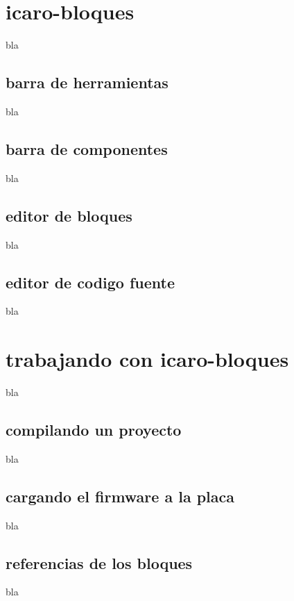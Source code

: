 \documentclass[letterpaper,10pt,english]{sphinxmanual}
\begin{document}
\chapter{icaro-bloques}
\label{icaro_bloques:icaro-bloques}\label{icaro_bloques::doc}
bla


\section{barra de herramientas}
\label{icaro_bloques:barra-de-herramientas}
bla


\section{barra de componentes}
\label{icaro_bloques:barra-de-componentes}
bla


\section{editor  de bloques}
\label{icaro_bloques:editor-de-bloques}
bla


\section{editor de codigo fuente}
\label{icaro_bloques:editor-de-codigo-fuente}
bla


\chapter{trabajando con icaro-bloques}
\label{icaro_bloques_2:trabajando-con-icaro-bloques}\label{icaro_bloques_2::doc}
bla


\section{compilando un proyecto}
\label{icaro_bloques_2:compilando-un-proyecto}
bla


\section{cargando el firmware a la placa}
\label{icaro_bloques_2:cargando-el-firmware-a-la-placa}
bla


\section{referencias de los bloques}
\label{icaro_bloques_2:referencias-de-los-bloques}
bla
\end{document}

